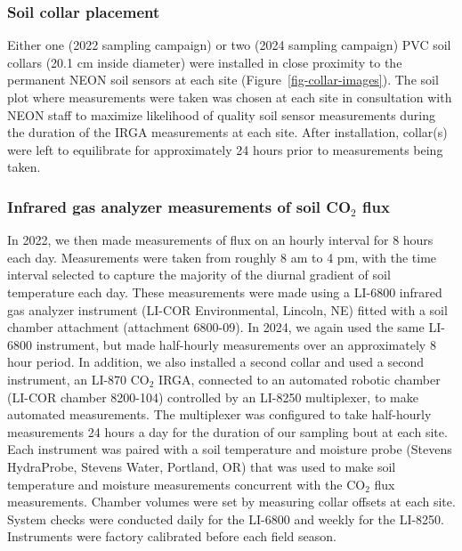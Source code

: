 \documentclass[
  letterpaper,
  DIV=11,
  numbers=noendperiod]{scrartcl}
\begin{document}
\subsubsection{Soil collar placement}\label{soil-collar-placement}

Either one (2022 sampling campaign) or two (2024 sampling campaign) PVC
soil collars (20.1 cm inside diameter) were installed in close proximity
to the permanent NEON soil sensors at each site
(Figure~\ref{fig-collar-images}). The soil plot where measurements were
taken was chosen at each site in consultation with NEON staff to
maximize likelihood of quality soil sensor measurements during the
duration of the IRGA measurements at each site. After installation,
collar(s) were left to equilibrate for approximately 24 hours prior to
measurements being taken.

\subsubsection{\texorpdfstring{Infrared gas analyzer measurements of
soil CO\(_{2}\)
flux}{Infrared gas analyzer measurements of soil CO\_\{2\} flux}}\label{infrared-gas-analyzer-measurements-of-soil-co_2-flux}

In 2022, we then made measurements of flux on an hourly interval for 8
hours each day. Measurements were taken from roughly 8 am to 4 pm, with
the time interval selected to capture the majority of the diurnal
gradient of soil temperature each day. These measurements were made
using a LI-6800 infrared gas analyzer instrument (LI-COR Environmental,
Lincoln, NE) fitted with a soil chamber attachment (attachment 6800-09).
In 2024, we again used the same LI-6800 instrument, but made half-hourly
measurements over an approximately 8 hour period. In addition, we also
installed a second collar and used a second instrument, an LI-870
CO\(_{2}\) IRGA, connected to an automated robotic chamber (LI-COR
chamber 8200-104) controlled by an LI-8250 multiplexer, to make
automated measurements. The multiplexer was configured to take
half-hourly measurements 24 hours a day for the duration of our sampling
bout at each site. Each instrument was paired with a soil temperature
and moisture probe (Stevens HydraProbe, Stevens Water, Portland, OR)
that was used to make soil temperature and moisture measurements
concurrent with the CO\(_{2}\) flux measurements. Chamber volumes were
set by measuring collar offsets at each site. System checks were
conducted daily for the LI-6800 and weekly for the LI-8250. Instruments
were factory calibrated before each field season.
\end{document}
